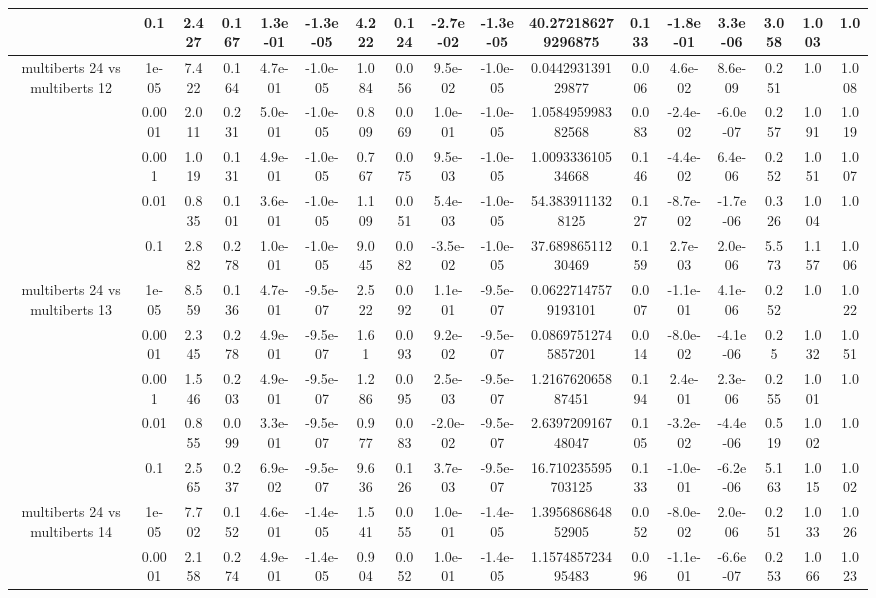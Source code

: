 \begin{tabular}{|c|c|c|c|c|c|c|c|c|c|c|c|c|c|c|c|c|}
 & 0.1 & 2.427 & 0.167 & 1.3e-01 & -1.3e-05 & 4.222 & 0.124 & -2.7e-02 & -1.3e-05 & 40.272186279296875 & 0.133 & -1.8e-01 & 3.3e-06 & 3.058 & 1.003 & 1.0 \\
\hline
\multirow{5}{*}{multiberts 24 vs multiberts 12} & 1e-05 & 7.422 & 0.164 & 4.7e-01 & -1.0e-05 & 1.084 & 0.056 & 9.5e-02 & -1.0e-05 & 0.044293139129877 & 0.006 & 4.6e-02 & 8.6e-09 & 0.251 & 1.0 & 1.008 \\
 & 0.0001 & 2.011 & 0.231 & 5.0e-01 & -1.0e-05 & 0.809 & 0.069 & 1.0e-01 & -1.0e-05 & 1.058495998382568 & 0.083 & -2.4e-02 & -6.0e-07 & 0.257 & 1.091 & 1.019 \\
 & 0.001 & 1.019 & 0.131 & 4.9e-01 & -1.0e-05 & 0.767 & 0.075 & 9.5e-03 & -1.0e-05 & 1.009333610534668 & 0.146 & -4.4e-02 & 6.4e-06 & 0.252 & 1.051 & 1.007 \\
 & 0.01 & 0.835 & 0.101 & 3.6e-01 & -1.0e-05 & 1.109 & 0.051 & 5.4e-03 & -1.0e-05 & 54.3839111328125 & 0.127 & -8.7e-02 & -1.7e-06 & 0.326 & 1.004 & 1.0 \\
 & 0.1 & 2.882 & 0.278 & 1.0e-01 & -1.0e-05 & 9.045 & 0.082 & -3.5e-02 & -1.0e-05 & 37.68986511230469 & 0.159 & 2.7e-03 & 2.0e-06 & 5.573 & 1.157 & 1.006 \\
\hline
\multirow{5}{*}{multiberts 24 vs multiberts 13} & 1e-05 & 8.559 & 0.136 & 4.7e-01 & -9.5e-07 & 2.522 & 0.092 & 1.1e-01 & -9.5e-07 & 0.06227147579193101 & 0.007 & -1.1e-01 & 4.1e-06 & 0.252 & 1.0 & 1.022 \\
 & 0.0001 & 2.345 & 0.278 & 4.9e-01 & -9.5e-07 & 1.61 & 0.093 & 9.2e-02 & -9.5e-07 & 0.08697512745857201 & 0.014 & -8.0e-02 & -4.1e-06 & 0.25 & 1.032 & 1.051 \\
 & 0.001 & 1.546 & 0.203 & 4.9e-01 & -9.5e-07 & 1.286 & 0.095 & 2.5e-03 & -9.5e-07 & 1.216762065887451 & 0.194 & 2.4e-01 & 2.3e-06 & 0.255 & 1.001 & 1.0 \\
 & 0.01 & 0.855 & 0.099 & 3.3e-01 & -9.5e-07 & 0.977 & 0.083 & -2.0e-02 & -9.5e-07 & 2.639720916748047 & 0.105 & -3.2e-02 & -4.4e-06 & 0.519 & 1.002 & 1.0 \\
 & 0.1 & 2.565 & 0.237 & 6.9e-02 & -9.5e-07 & 9.636 & 0.126 & 3.7e-03 & -9.5e-07 & 16.710235595703125 & 0.133 & -1.0e-01 & -6.2e-06 & 5.163 & 1.015 & 1.002 \\
\hline
\multirow{5}{*}{multiberts 24 vs multiberts 14} & 1e-05 & 7.702 & 0.152 & 4.6e-01 & -1.4e-05 & 1.541 & 0.055 & 1.0e-01 & -1.4e-05 & 1.395686864852905 & 0.052 & -8.0e-02 & 2.0e-06 & 0.251 & 1.033 & 1.026 \\
 & 0.0001 & 2.158 & 0.274 & 4.9e-01 & -1.4e-05 & 0.904 & 0.052 & 1.0e-01 & -1.4e-05 & 1.157485723495483 & 0.096 & -1.1e-01 & -6.6e-07 & 0.253 & 1.066 & 1.023 \\

\end{tabular}
